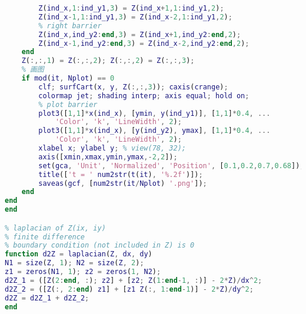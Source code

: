 \begin{lstlisting}[language=matlab]
        % left barrier
        Z(ind_x,1:ind_y1,3) = Z(ind_x+1,1:ind_y1,2);
        Z(ind_x-1,1:ind_y1,3) = Z(ind_x-2,1:ind_y1,2);
        % right barrier
        Z(ind_x,ind_y2:end,3) = Z(ind_x+1,ind_y2:end,2);
        Z(ind_x-1,ind_y2:end,3) = Z(ind_x-2,ind_y2:end,2);
    end
    Z(:,:,1) = Z(:,:,2); Z(:,:,2) = Z(:,:,3);
    % 画图
    if mod(it, Nplot) == 0
        clf; surfCart(x, y, Z(:,:,3)); caxis(crange);
        colormap jet; shading interp; axis equal; hold on;
        % plot barrier
        plot3([1,1]*x(ind_x), [ymin, y(ind_y1)], [1,1]*0.4, ...
            'Color', 'k', 'LineWidth', 2);
        plot3([1,1]*x(ind_x), [y(ind_y2), ymax], [1,1]*0.4, ...
            'Color', 'k', 'LineWidth', 2);
        xlabel x; ylabel y; % view(78, 32);
        axis([xmin,xmax,ymin,ymax,-2,2]);
        set(gca, 'Unit', 'Normalized', 'Position', [0.1,0.2,0.7,0.68]);
        title(['t = ' num2str(t(it), '%.2f')]);
        saveas(gcf, [num2str(it/Nplot) '.png']);
    end
end
end

% laplacian of Z(ix, iy)
% finite difference
% boundary condition (not included in Z) is 0
function d2Z = laplacian(Z, dx, dy)
N1 = size(Z, 1); N2 = size(Z, 2);
z1 = zeros(N1, 1); z2 = zeros(1, N2);
d2Z_1 = ([Z(2:end, :); z2] + [z2; Z(1:end-1, :)] - 2*Z)/dx^2;
d2Z_2 = ([Z(:, 2:end) z1] + [z1 Z(:, 1:end-1)] - 2*Z)/dy^2;
d2Z = d2Z_1 + d2Z_2;
end
\end{lstlisting}
